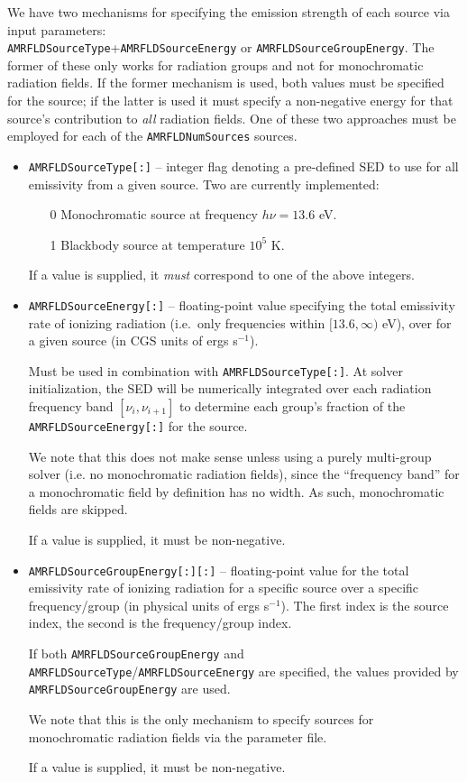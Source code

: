 \documentclass[10pt]{article}
\renewcommand{\(}{\left(}
\renewcommand{\)}{\right)}
\begin{document}
We have two mechanisms for specifying the emission strength of each
source via input parameters: \\
{\tt AMRFLDSourceType}+{\tt AMRFLDSourceEnergy} or
{\tt AMRFLDSourceGroupEnergy}.  The former of these only works for
radiation groups and not for monochromatic radiation fields.  If the
former mechanism is used, both values must be specified for the
source; if the latter is used it must specify a non-negative energy
for that source's contribution to {\em all} radiation fields.  One of
these two approaches must be employed for each of the 
{\tt AMRFLDNumSources} sources.
\begin{itemize}
\item {\tt AMRFLDSourceType[:]} -- integer flag denoting a pre-defined
  SED to use for all emissivity from a given source.  Two are
  currently implemented:
  \begin{itemize}
  \item[0] Monochromatic source at frequency $h\nu=13.6$ eV.
  \item[1] Blackbody source at temperature $10^5$ K.
  \end{itemize}
  If a value is supplied, it {\em must} correspond to one of the above
  integers. 
\item {\tt AMRFLDSourceEnergy[:]} -- floating-point value specifying
  the total emissivity rate of ionizing radiation (i.e.~only
  frequencies within $[13.6,\infty)$ eV), over for a given source (in
  CGS units of ergs s$^{-1}$).

  Must be used in combination with {\tt AMRFLDSourceType[:]}.  At
  solver initialization, the SED will be numerically integrated over
  each radiation frequency band $[\nu_i, \nu_{i+1}]$ to determine each
  group's fraction of the {\tt AMRFLDSourceEnergy[:]} for the source.

  We note that this does not make sense unless using a purely
  multi-group solver (i.e. no monochromatic radiation fields), since
  the ``frequency band'' for a monochromatic field by definition has
  no width.  As such, monochromatic fields are skipped.

  If a value is supplied, it must be non-negative.
\item {\tt AMRFLDSourceGroupEnergy[:][:]} -- floating-point value for
  the total emissivity rate of ionizing radiation for a specific
  source over a specific frequency/group (in physical units of ergs
  s$^{-1}$).  The first index is the source index, the second is the
  frequency/group index. 

  If both {\tt AMRFLDSourceGroupEnergy} and 
  {\tt AMRFLDSourceType}/{\tt AMRFLDSourceEnergy} are specified, the
  values provided by {\tt AMRFLDSourceGroupEnergy} are used.

  We note that this is the only mechanism to specify sources
  for monochromatic radiation fields via the parameter file.

  If a value is supplied, it must be non-negative.
\end{itemize}
\end{document}
